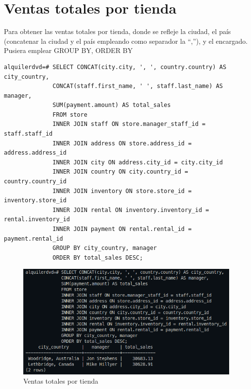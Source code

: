 \documentclass{report}
\begin{document}
\section{Ventas totales por tienda}
Para obtener las ventas totales por tienda, donde se refleje la ciudad, el país
(concatenar la ciudad y el país empleando como separador la “,”), y el
encargado. Pusiera emplear GROUP BY, ORDER BY
\begin{verbatim}
alquilerdvd=# SELECT CONCAT(city.city, ', ', country.country) AS city_country,
              CONCAT(staff.first_name, ' ', staff.last_name) AS manager,
              SUM(payment.amount) AS total_sales
              FROM store
              INNER JOIN staff ON store.manager_staff_id = staff.staff_id
              INNER JOIN address ON store.address_id = address.address_id
              INNER JOIN city ON address.city_id = city.city_id
              INNER JOIN country ON city.country_id = country.country_id
              INNER JOIN inventory ON store.store_id = inventory.store_id
              INNER JOIN rental ON inventory.inventory_id = rental.inventory_id
              INNER JOIN payment ON rental.rental_id = payment.rental_id
              GROUP BY city_country, manager
              ORDER BY total_sales DESC;
\end{verbatim}
\begin{figure}[H]
  \centering
  \includegraphics[scale=0.60]{img/querie_b.png}
  \caption{Ventas totales por tienda}
  \label{fig:ventas totales por tienda}
\end{figure}

\cleardoublepage

\end{document}
